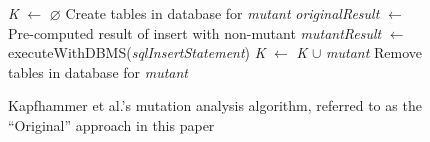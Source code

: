 
\begin{figure}[p]
\begin{algorithmic}
\footnotesize

\State \emph{K} $ \gets $ \emph{$\varnothing$}
	\State Create tables in database for \emph{mutant}
		\State \emph{originalResult} $ \gets $ Pre-computed result of insert with non-mutant 
		\State \emph{mutantResult} $ \gets $ executeWithDBMS(\emph{sqlInsertStatement})
			\State \emph{K} $ \gets $ \emph{K} $\cup$ \emph{mutant}
		\EndIf
	\EndFor
	\State Remove tables in database for \emph{mutant}
\EndFor

\end{algorithmic}

\caption{\label{alg:original}Kapfhammer et al.'s mutation analysis algorithm, referred to as the ``Original'' approach in this paper}
\vspace{-1em}
\end{figure}
